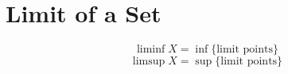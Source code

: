 \section{Limit of a Set}
\begin{definition}
	\[ \liminf X = \inf \{ \text{limit points} \} \]
	\[ \limsup X = \sup \{ \text{limit points} \} \]
\end{definition}
